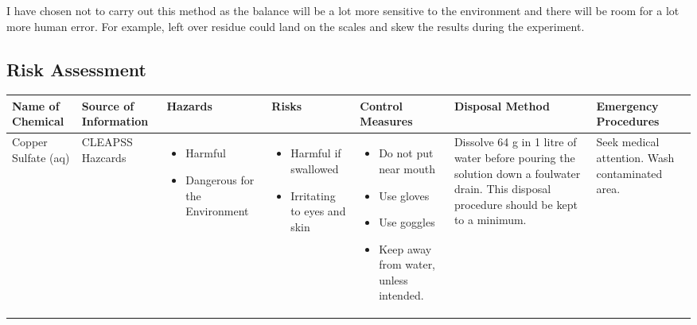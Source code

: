 I have chosen not to carry out this method as the balance will be a lot more sensitive to the environment and there will be room for a lot more human error. For example, left over residue could land on the scales and skew the results during the experiment. 


\begin{landscape}

\section{Risk Assessment}

\begin{center}
\begin{longtable}{|p{1.5cm}|p{1.5cm}|p{3cm}|p{3cm}|p{3cm}|p{3cm}|p{2cm}|}
    \hline
 \textbf{Name of Chemical} & \textbf{Source of Information} & \textbf{Hazards} & \textbf{Risks} & \textbf{Control Measures} & \textbf{Disposal Method} & \textbf{Emergency Procedures} \\ \hline

Copper Sulfate (aq) &
CLEAPSS Hazcards &
\begin{itemize}
\item Harmful
\item Dangerous for the Environment \end{itemize} &
\begin{itemize}
\item Harmful if swallowed
\item Irritating to eyes and skin \end{itemize} &
\begin{itemize}
\item Do not put near mouth
\item Use gloves
\item Use goggles
\item Keep away from water, unless intended. \end{itemize} & 
Dissolve 64 g in 1 litre of water before pouring the solution down a foulwater drain. This disposal procedure should be kept to a minimum. &
Seek medical attention. Wash contaminated area. \\ \hline


\end{longtable}
\end{center}
\end{landscape}

